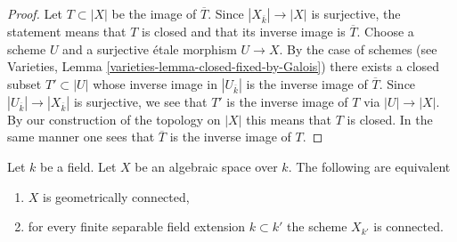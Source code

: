 \begin{proof}
Let $T \subset |X|$ be the image of $\overline{T}$.
Since $|X_{\overline{k}}| \to |X|$ is surjective, the statement means
that $T$ is closed and that its inverse image is $\overline{T}$.
Choose a scheme $U$ and a surjective \'etale morphism $U \to X$.
By the case of schemes
(see Varieties, Lemma \ref{varieties-lemma-closed-fixed-by-Galois})
there exists a closed subset $T' \subset |U|$ whose inverse image
in $|U_{\overline{k}}|$ is the inverse image of $\overline{T}$.
Since $|U_{\overline{k}}| \to |X_{\overline{k}}|$ is surjective,
we see that $T'$ is the inverse image of $T$ via $|U| \to |X|$.
By our construction of the topology on $|X|$ this means that $T$ is
closed. In the same manner one sees that $\overline{T}$ is the inverse
image of $T$.
\end{proof}

\begin{lemma}
\label{lemma-characterize-geometrically-disconnected}
Let $k$ be a field. Let $X$ be an algebraic space over $k$.
The following are equivalent
\begin{enumerate}
\item $X$ is geometrically connected,
\item for every finite separable field extension $k \subset k'$
the scheme $X_{k'}$ is connected.
\end{enumerate}
\end{lemma}

